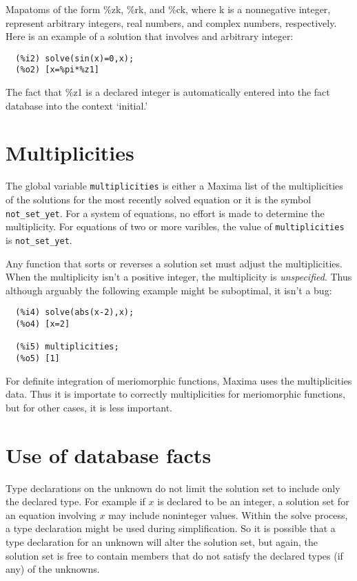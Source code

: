 \documentclass[]{scrartcl}
\begin{document}
Mapatoms of the form \%zk, \%rk, and \%ck, where k is a nonnegative integer, represent arbitrary
integers, real numbers, and complex numbers, respectively. Here is an example of a solution that
involves and arbitrary integer:
\begin{verbatim}
  (%i2)	solve(sin(x)=0,x);
  (%o2)	[x=%pi*%z1]
\end{verbatim}
The fact that \%z1 is a declared integer is automatically entered into the fact database into the
context `initial.'

\section{Multiplicities}

The global variable \texttt{multiplicities} is either a Maxima list of the multiplicities of the solutions for the most recently solved equation or it is the symbol \texttt{not\_set\_yet}. For
a system of equations, no effort is made to determine the multiplicity. For equations of
two or more varibles, the value of \texttt{multiplicities} is \texttt{not\_set\_yet}.

Any function that sorts or reverses a solution set must adjust the multiplicities. When the
multiplicity isn't a positive integer, the multiplicity is \emph{unspecified}. Thus although
arguably the following example might be suboptimal, it isn't a bug:
\begin{verbatim}
  (%i4)	solve(abs(x-2),x);
  (%o4)	[x=2]

  (%i5)	multiplicities;
  (%o5)	[1]
\end{verbatim}
For definite integration of meriomorphic functions, Maxima uses the multiplicities data. Thus
it is importate to correctly multiplicities for meriomorphic functions, but for other cases,
it is less important.

\section{Use of database facts}

Type declarations on the unknown do not limit the solution set to include only the declared type.
For example if \(x\) is declared to be an integer, a solution set for an equation involving \(x\)
may include noninteger values. Within the solve process, a type declaration might be used during
simplification. So it is possible that a type declaration for an unknown will alter the solution
set, but again, the solution set is free to contain members that do not satisfy the declared types
(if any) of the unknowns.
\end{document}
